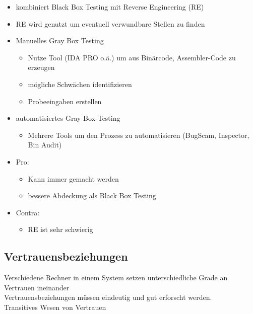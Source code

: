 \documentclass{article} %
\begin{document}
\begin{itemize}
	\item kombiniert Black Box Testing mit Reverse Engineering (RE)
    \item RE wird genutzt um eventuell verwundbare Stellen zu finden
    \item Manuelles Gray Box Testing
    
    \begin{itemize}
        \item Nutze Tool (IDA PRO o.ä.) um aus Binärcode, Assembler-Code zu erzeugen
        \item mögliche Schwächen identifizieren
        \item Probeeingaben erstellen
    \end{itemize}
    \item automatisiertes Gray Box Testing
    
    \begin{itemize}
        \item Mehrere Tools um den Prozess zu automatisieren (BugScam, Inspector, Bin Audit)
    \end{itemize}
    \item Pro:
    
    \begin{itemize}
        \item Kann immer gemacht werden
        \item bessere Abdeckung als Black Box Testing
    \end{itemize}
    \item Contra:
    
    \begin{itemize}
        \item RE ist sehr schwierig
    \end{itemize}
\end{itemize}
\subsection{Vertrauensbeziehungen}
Verschiedene Rechner in einem System setzen unterschiedliche Grade an Vertrauen ineinander\\
Vertrauensbeziehungen müssen eindeutig und gut erforscht werden.\\
Transitives Wesen von Vertrauen\\
\end{document}
